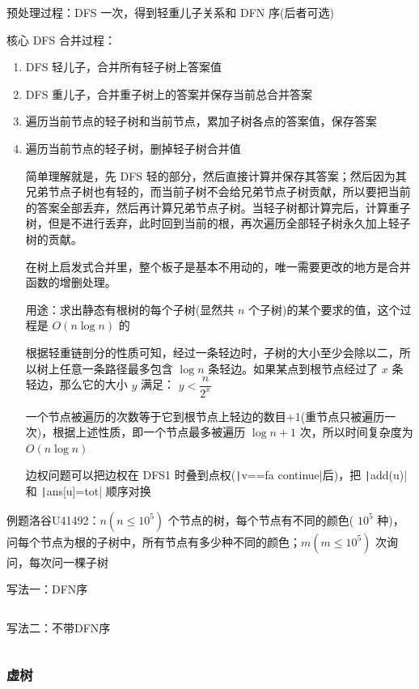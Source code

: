 \documentclass[twocolumn,10pt]{ctexart}
\begin{document}
预处理过程：DFS 一次，得到轻重儿子关系和 DFN 序(后者可选)

核心 DFS 合并过程：

\begin{enumerate}
\item DFS 轻儿子，合并所有轻子树上答案值
\item DFS 重儿子，合并重子树上的答案并保存当前总合并答案
\item 遍历当前节点的轻子树和当前节点，累加子树各点的答案值，保存答案
\item 遍历当前节点的轻子树，删掉轻子树合并值

简单理解就是，先 DFS 轻的部分，然后直接计算并保存其答案；然后因为其兄弟节点子树也有轻的，而当前子树不会给兄弟节点子树贡献，所以要把当前的答案全部丢弃，然后再计算兄弟节点子树。当轻子树都计算完后，计算重子树，但是不进行丢弃，此时回到当前的根，再次遍历全部轻子树永久加上轻子树的贡献。

在树上启发式合并里，整个板子是基本不用动的，唯一需要更改的地方是合并函数的增删处理。

用途：求出静态有根树的每个子树(显然共 $n$ 个子树)的某个要求的值，这个过程是 $O(n\log n)$ 的

根据轻重链剖分的性质可知，经过一条轻边时，子树的大小至少会除以二，所以树上任意一条路径最多包含 $\log n$ 条轻边。如果某点到根节点经过了 $x$ 条轻边，那么它的大小 $y$ 满足： $y <\dfrac n{2^x}$

一个节点被遍历的次数等于它到根节点上轻边的数目+1(重节点只被遍历一次)，根据上述性质，即一个节点最多被遍历 $\log n+1$ 次，所以时间复杂度为 $O(n\log n)$

边权问题可以把边权在 DFS1 时叠到点权(\texttt|v==fa continue|后)，把 \texttt|add(u)| 和 \texttt|ans[u]=tot| 顺序对换
\end{enumerate}

\begin{notebox}
例题洛谷U41492：$n(n\le 10^5)$ 个节点的树，每个节点有不同的颜色( $10^5$ 种)，问每个节点为根的子树中，所有节点有多少种不同的颜色；$m(m\le 10^5)$ 次询问，每次问一棵子树
\end{notebox}

写法一：DFN序

\inputminted{cpp}{code/u41492_dsu_on_tree.cpp}

写法二：不带DFN序

\inputminted{cpp}{code/ext_031.cpp}

\subsubsection{虚树}
\end{document}
